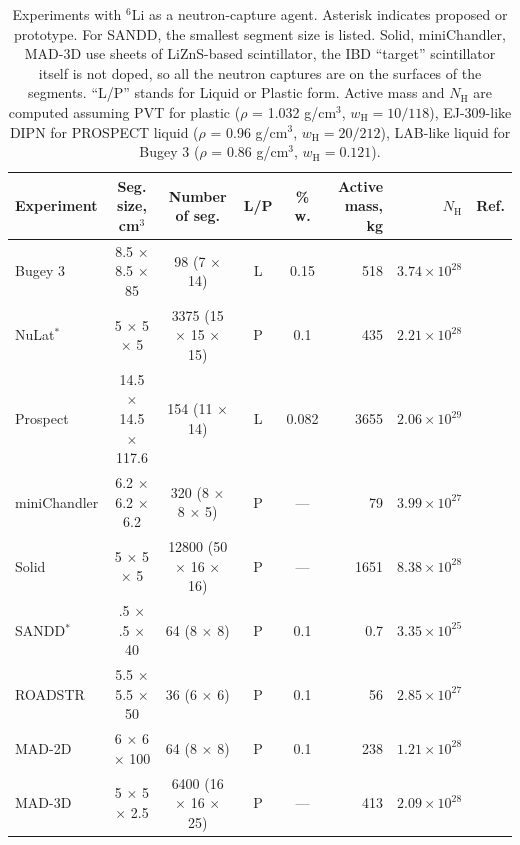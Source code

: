 \documentclass[tightenlines,
twocolumn,prl,notitlepage,nofootinbib,preprintnumbers,longbibliography]{revtex4-1}
\begin{document}
\begin{table}
    \centering
 \begin{tabular}{|l|c|c|c|c|r|r|c|}\hline
    Experiment & Seg. size, cm$^3$ & Number of seg. & L/P & \% w. & Active mass, kg & $ N_{\mathrm{H}} $ & Ref. \\\hline
    Bugey 3 & 8.5 $\times$ 8.5 $\times$ 85 & 98 (7 $\times$ 14) & L & 0.15 & 518 & $ 3.74 \times 10^{28} $ & \cite{Bugey3_1996}\\
    NuLat$^{*}$ & 5 $\times$ 5 $\times$ 5 & 3375 (15 $\times$ 15 $\times$ 15) & P & 0.1 & 435 & $ 2.21 \times 10^{28} $ & \cite{NuLat:2015wgu}\\
    Prospect & 14.5 $\times$ 14.5 $\times$ 117.6 & 154 (11 $\times$ 14)  & L & 0.082 & 3655 & $ 2.06 \times 10^{29} $ & \cite{Ashenfelter_2019} \\
    miniChandler & 6.2 $\times$ 6.2 $\times$ 6.2 &  320 (8 $\times$ 8 $\times$ 5) & P & --- & 79 & $ 3.99 \times 10^{27} $ & \cite{Haghighat:2018mve} \\
    Solid & 5 $\times$ 5 $\times$ 5  & 12800 (50 $\times$ 16 $\times$ 16) & P & --- & 1651 & $ 8.38 \times 10^{28} $ & \cite{Abreu_2021}\\
    SANDD$^{*}$ & .5 $\times$ .5 $\times$ 40 & 64 (8 $\times$ 8) & P & 0.1 & 0.7 & $ 3.35 \times 10^{25} $ & \cite{Sutanto:2021xpo} \\
    ROADSTR & 5.5 $\times$ 5.5 $\times$ 50 & 36 (6 $\times$ 6) & P & 0.1 & 56 & $ 2.85 \times 10^{27} $ & \cite{MobileAntineutrinoDemonstratorProject:2025sna} \\
    MAD-2D & 6 $\times$ 6 $\times$ 100 & 64 (8 $\times$ 8) & P & 0.1 & 238 & $ 1.21 \times 10^{28} $ & \cite{bowden_mobile_2023} \\
    MAD-3D & 5 $\times$ 5 $\times$ 2.5  & 6400 (16 $\times$ 16 $\times$ 25)  & P & --- & 413 & $ 2.09 \times 10^{28} $ & \cite{bowden_mobile_2023} \\
    \hline
\end{tabular}
    \caption{Experiments with $^6$Li as a neutron-capture agent. Asterisk indicates proposed or prototype. For SANDD, the smallest segment size is listed. Solid, miniChandler, MAD-3D use sheets of LiZnS-based scintillator, the IBD ``target'' scintillator itself is not doped, so all the neutron captures are on the surfaces of the segments. ``L/P'' stands for Liquid or Plastic form. Active mass and $ N_{\mathrm{H}} $ are computed assuming PVT for plastic ($\rho$ = 1.032 g/cm$^{3}$, $ w_{\mathrm{H}} = 10/118 $), EJ-309-like DIPN for PROSPECT liquid ($\rho$ = 0.96 g/cm$^{3}$, $ w_{\mathrm{H}} = 20/212 $), LAB-like liquid for Bugey 3 ($\rho$ = 0.86 g/cm$^{3}$, $ w_{\mathrm{H}} = 0.121 $).} %
    \label{tab_Li6_detectors}
\end{table}
\end{document}
